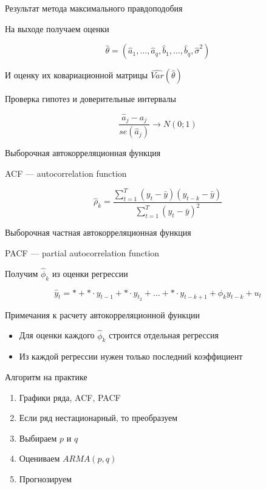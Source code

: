 \documentclass[ignorenonframetext,]{beamer}
\begin{document}
\begin{frame}{Результат метода максимального правдоподобия}

На выходе получаем оценки

\[
\hat{\theta}=(\hat{a}_1, \ldots, \hat{a}_q, \hat{b}_1, \ldots, \hat{b}_q, \hat{\sigma}^2)
\]

И оценку их ковариационной матрицы $\widehat{Var}(\hat{\theta})$

\end{frame}

\begin{frame}{Проверка гипотез и доверительные интервалы}

\[
\frac{\hat{a}_j - a_j}{se(\hat{a}_j)} \to N(0;1)
\]

\end{frame}

\begin{frame}{Выборочная автокорреляционная функция}

ACF --- autocorrelation function

\[
\hat{\rho}_k = \frac{\sum_{t=1}^{T} (y_t-\bar{y})(y_{t-k}-\bar{y})}{\sum_{t=1}^{T} (y_t-\bar{y})^2}
\]

\end{frame}

\begin{frame}{Выборочная частная автокорреляционная функция}

PACF --- partial autocorrelation function

Получим $\hat{\phi}_k$ из оценки регрессии

\[
\hat{y}_t = * + * \cdot y_{t-1} + *  \cdot y_{t_2} + \ldots + *  \cdot y _{t-k+1} + \phi_k y_{t-k} + u_t
\]

\end{frame}

\begin{frame}{Примечания к расчету автокорреляционной функции}

\begin{itemize}
\item
  Для оценки каждого $\hat{\phi}_k$ строится отдельная регрессия
\item
  Из каждой регрессии нужен только последний коэффициент
\end{itemize}

\end{frame}

\begin{frame}{Алгоритм на практике}

\begin{enumerate}
\def\labelenumi{\arabic{enumi}.}
\item
  Графики ряда, ACF, PACF
\item
  Если ряд нестационарный, то преобразуем
\item
  Выбираем $p$ и $q$
\item
  Оцениваем $ARMA(p,q)$
\item
  Прогнозируем
\end{enumerate}

\end{frame}
\end{document}
